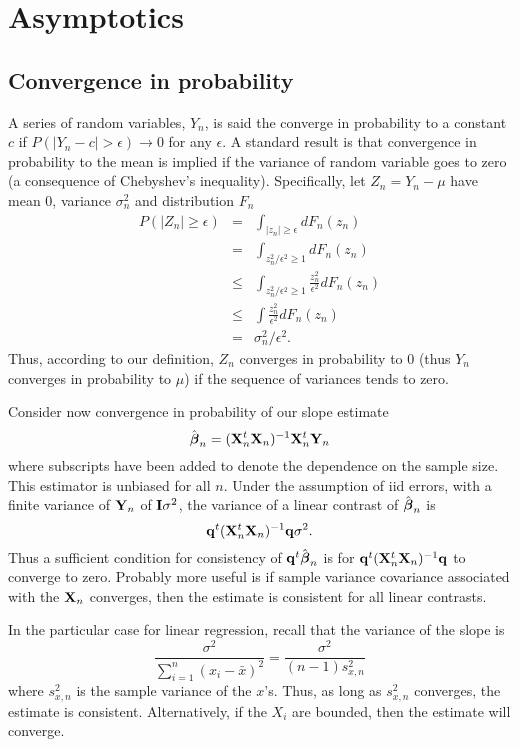 \section{Asymptotics}

\subsection{Convergence in probability}
A series of random variables, $Y_n$, is said the converge in probability to 
a constant $c$ if $P( | Y_n - c| > \epsilon) \rightarrow 0$ for any $\epsilon$. 
A standard result is that convergence in probability to the mean is implied if the
variance of random variable goes to zero (a consequence of Chebyshev's inequality).
Specifically, let $Z_n = Y_n - \mu$ have mean $0$, variance 
$\sigma^2_n$
and distribution $F_n$
\begin{eqnarray*}
P( |Z_n | \geq  \epsilon) & = & 
\int_{|z_n | \geq \epsilon} dF_n (z_n) \\
& =  & 
\int_{z_n^2 / \epsilon^2 \geq 1} dF_n (z_n) \\
& \leq & \int_{z_n^2 / \epsilon^2 \geq 1} \frac{z_n^2}{\epsilon^2} dF_n (z_n)\\
& \leq & \int \frac{z_n^2}{\epsilon^2} dF_n (z_n)\\
& = & \sigma^2_n / \epsilon^2.
\end{eqnarray*}
Thus, according to our definition, $Z_n$ converges in probability 
to 0 (thus $Y_n$ converges in probability to $\mu$) if the
sequence of variances tends to zero. 

Consider now convergence in probability of our slope estimate
$$
\hat {\boldsymbol{\beta}}_n = (\mathbf{X}_n^t \mathbf{X}_n)^{-1}\mathbf{X}_n^t  \mathbf{Y}_n
$$
where subscripts have been added to denote the dependence on the sample size.
This estimator is unbiased for all $n$.
Under the assumption of iid errors, with a finite variance of $\mathbf{Y}_n$
of $\mathbf{I} \sigma^2$, the variance of a linear contrast of $\hat {\boldsymbol{\beta}}_n$ is
$$
\mathbf{q}^t (\mathbf{X}_n^t \mathbf{X}_n)^{-1} \mathbf{q} \sigma^2.
$$
Thus a sufficient condition for consistency of $\mathbf{q}^t \hat {\boldsymbol{\beta}}_n$ is 
for $\mathbf{q}^t (\mathbf{X}_n^t \mathbf{X}_n)^{-1} \mathbf{q}$ to converge to zero. Probably more
useful is if sample variance covariance associated with the $\mathbf{X}_n$ converges,
then the estimate is consistent for all linear contrasts.

In the particular case for linear regression, recall that the variance of the slope
is 
$$
\frac{\sigma^2}{\sum_{i=1}^n (x_{i} - \bar{x})^2} =
\frac{\sigma^2}{(n-1) s^2_{x,n}}
$$
where $s^2_{x,n}$ is the sample variance of the $x$'s. Thus, as long as
$s_{x,n}^2$ converges, the estimate is consistent. Alternatively,
if the $X_i$ are bounded, then the estimate will converge. 




